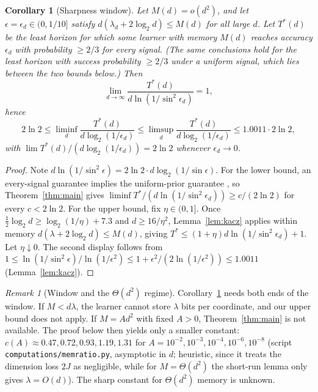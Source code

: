 \documentclass[11pt]{article}
\newtheorem{corollary}[theorem]{Corollary}
\theoremstyle{definition}
\theoremstyle{remark}
\newtheorem{remark}[theorem]{Remark}
\begin{document}
\begin{corollary}[Sharpness window]\label{cor:sharp}
Let \(M(d)=o(d^2)\), and let \(\epsilon=\epsilon_d\in(0,1/10]\) satisfy
\(d(\lambda_d+2\log_2 d)\le M(d)\) for all large \(d\). Let
\(T^*(d)\) be the least horizon for which some learner with memory
\(M(d)\) reaches accuracy \(\epsilon_d\) with probability \(\ge2/3\) for
every signal. (The same conclusions hold for the least horizon with success
probability \(\ge2/3\) under a uniform signal, which lies between the two bounds below.) Then
\[
 \lim_{d\to\infty}\frac{T^*(d)}{d\ln(1/\sin^2\epsilon_d)}=1,
\]
hence
\[
 2\ln2\le\liminf_{d}\frac{T^*(d)}{d\log_2(1/\epsilon_d)}\le\limsup_d\frac{T^*(d)}{d\log_2(1/\epsilon_d)}\le1.0011\cdot2\ln2,
\]
with \(\lim T^*(d)/(d\log_2(1/\epsilon_d))=2\ln2\) whenever \(\epsilon_d\to0\).
\end{corollary}
\begin{proof}
Note \(d\ln(1/\sin^2\epsilon)=2\ln2\cdot d\log_2(1/\sin\epsilon)\).
For the lower bound, an every-signal guarantee implies the uniform-prior guarantee
\cite[Corollary~1.3]{OAIsub}, so Theorem~\ref{thm:main} gives
\(\liminf T^*/(d\ln(1/\sin^2\epsilon_d))\ge c/(2\ln2)\) for every \(c<2\ln 2\).
For the upper bound, fix \(\eta\in(0,1]\). Once \(\tfrac12\log_2d\ge\log_2(1/\eta)+7.3\) and
\(d\ge16/\eta^2\), Lemma~\ref{lem:kacz} applies within memory
\(d(\lambda+2\log_2 d)\le M(d)\), giving \(T^*\le(1+\eta)d\ln(1/\sin^2\epsilon_d)+1\). Let \(\eta\downarrow0\).
The second display follows from
\(1\le\ln(1/\sin^2\epsilon)/\ln(1/\epsilon^2)\le1+\epsilon^2/(2\ln(1/\epsilon^2))\le1.0011\) (Lemma~\ref{lem:kacz}).
\end{proof}

\begin{remark}[Window and the \(\Theta(d^2)\) regime]
Corollary~\ref{cor:sharp} needs both ends of the window. If
\(M<d\lambda\), the learner cannot store \(\lambda\) bits per
coordinate, and our upper bound does not apply. If \(M=Ad^2\) with fixed
\(A>0\), Theorem~\ref{thm:main} is not available. The proof below then
yields only a smaller constant: \(c(A)\approx0.47,0.72,0.93,1.19,1.31\)
for \(A=10^{-2},10^{-3},10^{-4},10^{-6},10^{-8}\)
(script \texttt{computations/memratio.py}, asymptotic in \(d\); heuristic, since it treats the dimension loss \(2J\) as
negligible, while for \(M=\Theta(d^2)\) the short-run lemma only gives \(\lambda=O(d)\)). The sharp constant for
\(\Theta(d^2)\) memory is unknown.
\end{remark}
\end{document}
